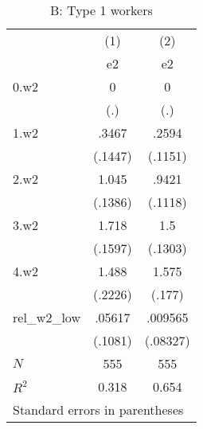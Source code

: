 \begin{table}[htbp]\centering
\caption{B: Type 1 workers}
\begin{tabular}{l*{2}{c}}
\hline\hline
            &\multicolumn{1}{c}{(1)}&\multicolumn{1}{c}{(2)}\\
            &\multicolumn{1}{c}{e2}&\multicolumn{1}{c}{e2}\\
\hline
0.w2        &           0&           0\\
            &         (.)&         (.)\\
[1em]
1.w2        &       .3467&       .2594\\
            &     (.1447)&     (.1151)\\
[1em]
2.w2        &       1.045&       .9421\\
            &     (.1386)&     (.1118)\\
[1em]
3.w2        &       1.718&         1.5\\
            &     (.1597)&     (.1303)\\
[1em]
4.w2        &       1.488&       1.575\\
            &     (.2226)&      (.177)\\
[1em]
rel\_w2\_low  &      .05617&     .009565\\
            &     (.1081)&    (.08327)\\
\hline
\(N\)       &         555&         555\\
\(R^{2}\)   &       0.318&       0.654\\
\hline\hline
\multicolumn{3}{l}{\footnotesize Standard errors in parentheses}\\
\end{tabular}
\end{table}
